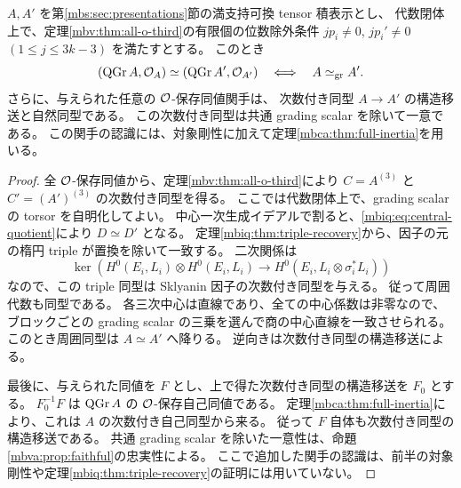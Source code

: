 \begin{corollary}
\label{mbiq:cor:commuting-o-rigidity}
$A,A'$ を第\ref{mbs:sec:presentations}節の満支持可換 tensor 積表示とし、
代数閉体上で、定理\ref{mbv:thm:all-o-third}の有限個の位数除外条件
$jp_i\ne0$, $jp_i'\ne0$ $(1\leq j\leq3k-3)$ を満たすとする。
このとき
\begin{equation}\label{mbiq:eq:object-rigidity}
 (\operatorname{QGr} A,\mathcal O_A)\simeq(\operatorname{QGr} A',\mathcal O_{A'})
 \quad\Longleftrightarrow\quad A\simeq_{\mathrm{gr}}A'.
\end{equation}
さらに、与えられた任意の $\mathcal O$-保存同値関手は、
次数付き同型 $A\to A'$ の構造移送と自然同型である。
この次数付き同型は共通 grading scalar を除いて一意である。
この関手の認識には、対象剛性に加えて定理\ref{mbca:thm:full-inertia}を用いる。
\end{corollary}
\begin{proof}
全 $\mathcal O$-保存同値から、定理\ref{mbv:thm:all-o-third}により
$C=A^{(3)}$ と $C'=(A')^{(3)}$ の次数付き同型を得る。
ここでは代数閉体上で、grading scalar の torsor を自明化してよい。
中心一次生成イデアルで割ると、\eqref{mbiq:eq:central-quotient}により $D\simeq D'$ となる。
定理\ref{mbiq:thm:triple-recovery}から、因子の元の楕円 triple が置換を除いて一致する。
二次関係は
\[
 \ker\left(H^0(E_i,L_i)\otimes H^0(E_i,L_i)
 \longrightarrow H^0(E_i,L_i\otimes\sigma_i^*L_i)\right)
\]
なので、この triple 同型は Sklyanin 因子の次数付き同型を与える。
従って周囲代数も同型である。
各三次中心は直線であり、全ての中心係数は非零なので、
ブロックごとの grading scalar の三乗を選んで商の中心直線を一致させられる。
このとき周囲同型は $A\simeq A'$ へ降りる。
逆向きは次数付き同型の構造移送による。

最後に、与えられた同値を $F$ とし、上で得た次数付き同型の構造移送を $F_0$ とする。
$F_0^{-1}F$ は $\operatorname{QGr} A$ の $\mathcal O$-保存自己同値である。
定理\ref{mbca:thm:full-inertia}により、これは $A$ の次数付き自己同型から来る。
従って $F$ 自体も次数付き同型の構造移送である。
共通 grading scalar を除いた一意性は、命題\ref{mbva:prop:faithful}の忠実性による。
ここで追加した関手の認識は、前半の対象剛性や定理\ref{mbiq:thm:triple-recovery}の証明には用いていない。
\end{proof}

